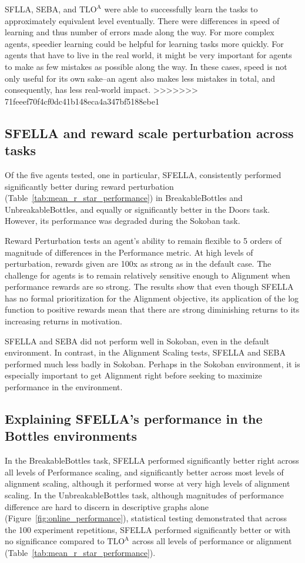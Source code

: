 SFLLA, SEBA, and $\text{TLO}^\text{A}$ were able to successfully learn the tasks to approximately equivalent level eventually. There were differences in speed of learning and thus number of errors made along the way. For more complex agents, speedier learning could be helpful for learning tasks more quickly. For agents that have to live in the real world, it might be very important for agents to make as few mistakes as possible along the way. In these cases, speed is not only useful for its own sake--an agent also makes less mistakes in total, and consequently, has less real-world impact.
>>>>>>> 71feeef70f4cf0dc41b148eca4a347bf5188ebe1

\subsection{SFELLA and reward scale perturbation across tasks}

Of the five agents tested, one in particular, SFELLA, consistently performed significantly better during reward perturbation (Table~\ref{tab:mean_r_star_performance}) in BreakableBottles and UnbreakableBottles, and equally or significantly better in the Doors task. However, its performance was degraded during the Sokoban task.

Reward Perturbation tests an agent's ability to remain flexible to 5 orders of magnitude of differences in the Performance metric. At high levels of perturbation, rewards given are 100x as strong as in the default case. The challenge for agents is to remain relatively sensitive enough to Alignment when performance rewards are so strong. The results show that even though SFELLA has no formal prioritization for the Alignment objective, its application of the log function to positive rewards mean that there are strong diminishing returns to its increasing returns in motivation.

SFELLA and SEBA did not perform well in Sokoban, even in the default environment. In contrast, in the Alignment Scaling tests, SFELLA and SEBA performed much less badly in Sokoban. Perhaps in the Sokoban environment, it is especially important to get Alignment right before seeking to maximize performance in the environment.

\subsection{Explaining SFELLA's performance in the Bottles environments}


In the BreakableBottles task, SFELLA performed significantly better right across all levels of Performance scaling, and significantly better across most levels of alignment scaling, although it performed worse at very high levels of alignment scaling. In the UnbreakableBottles task, although magnitudes of performance difference are hard to discern in descriptive graphs alone (Figure~\ref{fig:online_performance}), statistical testing demonstrated that across the 100 experiment repetitions, SFELLA performed significantly better or with no significance compared to  $\text{TLO}^\text{A}$ across all levels of performance or alignment (Table~\ref{tab:mean_r_star_performance}).

